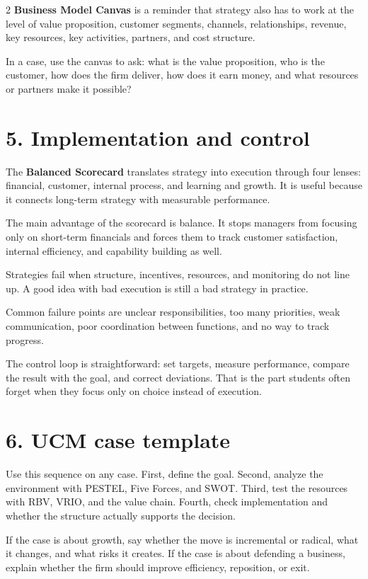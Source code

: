 \documentclass[8pt,letterpaper]{article}
\newcommand{\term}[1]{\textbf{#1}}
\begin{document}
\begin{multicols}{2}
\term{Business Model Canvas} is a reminder that strategy also has to work at the level of value proposition, customer segments, channels, relationships, revenue, key resources, key activities, partners, and cost structure.

In a case, use the canvas to ask: what is the value proposition, who is the customer, how does the firm deliver, how does it earn money, and what resources or partners make it possible?

\section*{5. Implementation and control}
The \term{Balanced Scorecard} translates strategy into execution through four lenses: financial, customer, internal process, and learning and growth. It is useful because it connects long-term strategy with measurable performance.

The main advantage of the scorecard is balance. It stops managers from focusing only on short-term financials and forces them to track customer satisfaction, internal efficiency, and capability building as well.

Strategies fail when structure, incentives, resources, and monitoring do not line up. A good idea with bad execution is still a bad strategy in practice.

Common failure points are unclear responsibilities, too many priorities, weak communication, poor coordination between functions, and no way to track progress.

The control loop is straightforward: set targets, measure performance, compare the result with the goal, and correct deviations. That is the part students often forget when they focus only on choice instead of execution.

\section*{6. UCM case template}
Use this sequence on any case. First, define the goal. Second, analyze the environment with PESTEL, Five Forces, and SWOT. Third, test the resources with RBV, VRIO, and the value chain. Fourth, check implementation and whether the structure actually supports the decision.

If the case is about growth, say whether the move is incremental or radical, what it changes, and what risks it creates. If the case is about defending a business, explain whether the firm should improve efficiency, reposition, or exit.


\end{multicols}
\end{document}

